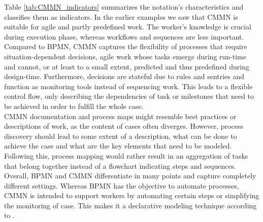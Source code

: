 Table \ref{tab:CMMN_indicators} summarizes the notation's characteristics and classifies them as indicators. In the earlier examples we saw that CMMN is suitable for agile and partly predefined work. The worker's knowledge is crucial during execution phase, whereas workflows and sequences are less important. Compared to BPMN, CMMN captures the flexibility of processes that require situation-dependent decisions, agile work whose tasks emerge during run-time and cannot, or at least to a small extent, predicted and thus predefined during design-time. Furthermore, decisions are stateful due to rules and sentries and function as monitoring tools instead of sequencing work. This leads to a flexible control flow, only describing the dependencies of task or milestones that need to be achieved in order to fulfill the whole case. \\
CMMN documentation and process maps might resemble best practices or descriptions of work, as the content of cases often diverges. However, process discovery should lead to some extent of a description, what can be done to achieve the case and what are the key elements that need to be modeled. Following this, process mapping would rather result in an aggregation of tasks that belong together instead of a flowchart indicating steps and sequences. \\
Overall, BPMN and CMMN differentiate in many points and capture completely different settings. Whereas BPMN has the objective to automate processes, CMMN is intended to support workers by automating certain steps or simplifying the monitoring of case. This makes it a declarative modeling technique according to \cite{FahlandLuebkeMendlingEtAl2009}. 


